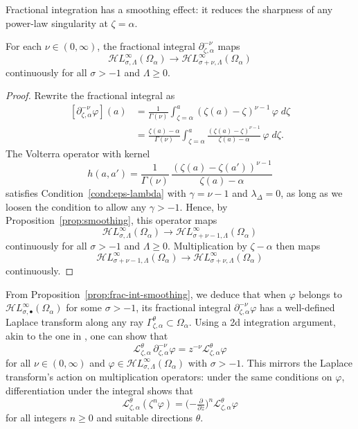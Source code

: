 \documentclass[final]{siamart220329}
\newcommand{\laplace}{\mathcal{L}}
\newcommand{\fracderiv}[3]{\partial^{#1}_{#2, #3}}
\newcommand{\singexp}[2]{\mathcal{H}L^\infty_{#1, #2}}
\newcommand{\singexpalg}[1]{\singexp{#1}{\bullet}}
\newcommand{\domain}{\Omega}
\begin{document}
Fractional integration has a smoothing effect: it reduces the sharpness of any power-law singularity at $\zeta = \alpha$.
\begin{proposition}\label{prop:frac-int-smoothing}
For each $\nu \in (0, \infty)$, the fractional integral $\fracderiv{-\nu}{\zeta}{\alpha}$ maps
\[ \singexp{\sigma}{\Lambda}(\domain_\alpha) \to \singexp{\sigma+\nu}{\Lambda}(\domain_\alpha) \]
continuously for all $\sigma > -1$ and $\Lambda \ge 0$.
\end{proposition}
\begin{proof}
Rewrite the fractional integral as
\begin{align*}
\left[\fracderiv{-\nu}{\zeta}{\alpha} \varphi\right](a)&=\frac{1}{\Gamma(\nu)}\int_{\zeta=\alpha}^a (\zeta(a)-\zeta)^{\nu-1} \, \varphi \; d\zeta\\
&=\frac{\zeta(a)-\alpha}{\Gamma(\nu)}\int_{\zeta=\alpha}^a \frac{(\zeta(a)-\zeta)^{\nu-1}}{\zeta(a)- \alpha}\,\varphi \; d\zeta.
\end{align*}
The Volterra operator with kernel
\[ h(a, a') = \frac{1}{\Gamma(\nu)}\,\frac{(\zeta(a)-\zeta(a'))^{\nu-1}}{\zeta(a)- \alpha} \]
satisfies Condition~\eqref{cond:eps-lambda} with $\gamma=\nu-1$ and $\lambda_\Delta=0$, as long as we loosen the condition to allow any $\gamma > -1$. Hence, by Proposition~\ref{prop:smoothing}, this operator maps
\[ \singexp{\sigma}{\Lambda}(\domain_\alpha) \to \singexp{\sigma+\nu-1}{\Lambda}(\domain_\alpha) \]
continuously for all $\sigma > -1$ and $\Lambda \ge 0$. Multiplication by $\zeta - \alpha$ then maps
\[ \singexp{\sigma+\nu-1}{\Lambda}(\domain_\alpha) \to \singexp{\sigma+\nu}{\Lambda}(\domain_\alpha) \]
continuously.
\end{proof}

From Proposition~\ref{prop:frac-int-smoothing}, we deduce that when $\varphi$ belongs to $\singexpalg{\sigma}(\domain_\alpha)$ for some $\sigma > -1$, its fractional integral $\fracderiv{-\nu}{\zeta}{\alpha}\varphi$ has a well-defined Laplace transform along any ray $\Gamma_{\zeta,\alpha}^{\theta}\subset\domain_\alpha$. Using a 2d integration argument, akin to the one in \cite[Theorem~2.39]{laplace-tfm}, one can show that 
\[ \laplace_{\zeta,\alpha}^{\theta}\,\fracderiv{-\nu}{\zeta}{\alpha} \varphi = z^{-\nu} \laplace_{\zeta, \alpha}^{\theta} \varphi \]
for all $\nu \in (0, \infty)$ and $\varphi\in\singexp{\sigma}{\Lambda}(\domain_\alpha)$ with $\sigma>-1$. This mirrors the Laplace transform's action on multiplication operators: under the same conditions on $\varphi$, differentiation under the integral shows that~\cite[Theorem~1.34]{laplace-tfm}
\[ \laplace_{\zeta,\alpha}^\theta (\zeta^n \varphi) = \big({-\tfrac{\partial}{\partial z}}\big)^n \laplace_{\zeta,\alpha}^\theta \varphi \]
for all integers $n \ge 0$ and suitable directions $\theta$.
\end{document}
